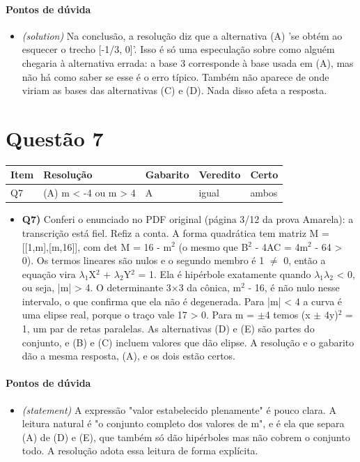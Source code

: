 \documentclass{article}%
\begin{document}
\paragraph{Pontos de dúvida}%
\begin{itemize}%
\item%
\textit{(solution)} Na conclusão, a resolução diz que a alternativa (A) 'se obtém ao esquecer o trecho {[}{-}1/3, 0{]}'. Isso é só uma especulação sobre como alguém chegaria à alternativa errada: a base 3 corresponde à base usada em (A), mas não há como saber se esse é o erro típico. Também não aparece de onde viriam as bases das alternativas (C) e (D). Nada disso afeta a resposta.%
\end{itemize}%
\section*{Questão 7}%
\begin{longtable}{@{}p{} p{} p{} p{} p{}@{}}\toprule Item & Resolução & Gabarito & Veredito & Certo \\ \midrule
Q7 & (A) m < {-}4 ou m > 4 & A & igual & ambos \\
\bottomrule\end{longtable}%
\begin{itemize}%
\item%
\textbf{Q7)} Conferi o enunciado no PDF original (página 3/12 da prova Amarela): a transcrição está fiel. Refiz a conta. A forma quadrática tem matriz M = {[}{[}1,m{]},{[}m,16{]}{]}, com det M = 16 - m$^2$ (o mesmo que B$^2$ - 4AC = 4m$^2$ - 64 > 0). Os termos lineares são nulos e o segundo membro é 1 $\neq$ 0, então a equação vira $\lambda$$_{1}$X$^2$ + $\lambda$$_{2}$Y$^2$ = 1. Ela é hipérbole exatamente quando $\lambda$$_{1}$$\lambda$$_{2}$ < 0, ou seja, |m| > 4. O determinante 3$\times$3 da cônica, m$^2$ - 16, é não nulo nesse intervalo, o que confirma que ela não é degenerada. Para |m| < 4 a curva é uma elipse real, porque o traço vale 17 > 0. Para m = $\pm$4 temos (x $\pm$ 4y)$^2$ = 1, um par de retas paralelas. As alternativas (D) e (E) são partes do conjunto, e (B) e (C) incluem valores que dão elipse. A resolução e o gabarito dão a mesma resposta, (A), e os dois estão certos.%
\end{itemize}%
\paragraph{Pontos de dúvida}%
\begin{itemize}%
\item%
\textit{(statement)} A expressão "valor estabelecido plenamente" é pouco clara. A leitura natural é "o conjunto completo dos valores de m", e é ela que separa (A) de (D) e (E), que também só dão hipérboles mas não cobrem o conjunto todo. A resolução adota essa leitura de forma explícita.%
\end{itemize}%
\end{document}
